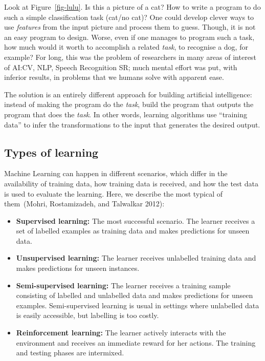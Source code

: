 \documentclass[
  letterpaper,
  12pt,
  british]{tufte-book}
\theoremstyle{plain}
\theoremstyle{plain}
\theoremstyle{definition}
\theoremstyle{remark}
\begin{document}
Look at Figure~\ref{fig-lulu}. Is this a picture of a cat? How to write
a program to do such a simple classification task (cat/no cat)? One
could develop clever ways to use \emph{features} from the input picture
and process them to guess. Though, it is not an easy program to design.
Worse, even if one manages to program such a task, how much would it
worth to accomplish a related \emph{task}, to recognise a dog, for
example? For long, this was the problem of researchers in many areas of
interest of AI:{CV}, {NLP}, Speech Recognition {SR}; much mental effort
was put, with inferior results, in problems that we humans solve with
apparent ease.

The solution is an entirely different approach for building artificial
intelligence: instead of making the program do the \emph{task}, build
the program that outputs the program that does the \emph{task}. In other
words, learning algorithms use ``training data'' to infer the
transformations to the input that generates the desired output.

\hypertarget{types-of-learning}{%
\subsection{Types of learning}\label{types-of-learning}}

Machine Learning can happen in different scenarios, which differ in the
availability of training data, how training data is received, and how
the test data is used to evaluate the learning. Here, we describe the
most typical of them~(Mohri, Rostamizadeh, and Talwalkar
2012):

\begin{itemize}
\item
  \textbf{Supervised learning:} The most successful scenario. The
  learner receives a set of labelled examples as training data and makes
  predictions for unseen data.
\item
  \textbf{Unsupervised learning:} The learner receives unlabelled
  training data and makes predictions for unseen instances.
\item
  \textbf{Semi-supervised learning:} The learner receives a training
  sample consisting of labelled and unlabelled data and makes
  predictions for unseen examples. Semi-supervised learning is usual in
  settings where unlabelled data is easily accessible, but labelling is
  too costly.
\item
  \textbf{Reinforcement learning:} The learner actively interacts with
  the environment and receives an immediate reward for her actions. The
  training and testing phases are intermixed.
\end{itemize}
\end{document}
